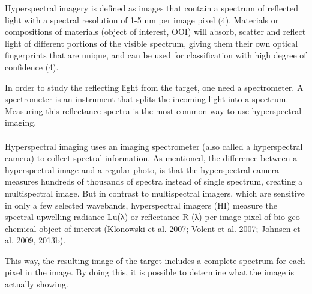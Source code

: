 Hyperspectral imagery is defined as images that contain a spectrum of reflected light with a spectral resolution of 1-5 nm per image pixel (4). Materials or compositions of materials (object of interest, OOI) will absorb, scatter and reflect light of different portions of the visible spectrum, giving them their own optical fingerprints that are unique, and can be used for classification with high degree of confidence (4). 

In order to study the reflecting light from the target, one need a spectrometer. A spectrometer is an instrument that splits the incoming light into a spectrum. Measuring this reflectance spectra is the most common way to use hyperspectral imaging.
\\\\
Hyperspectral imaging uses an imaging spectrometer (also called a hyperspectral camera) to collect spectral information. As mentioned, the difference between a hyperspectral image and a regular photo, is that the hyperspectral camera measures hundreds of thousands of spectra instead of single spectrum, creating a multispectral image. But in contrast to multispectral imagers, which are sensitive in only a few selected wavebands, hyperspectral imagers (HI) measure the spectral upwelling radiance Lu(λ) or reflectance R (λ) per image pixel of bio-geo-chemical object of interest (Klonowski et al. 2007; Volent et al. 2007; Johnsen et al. 2009, 2013b). %

This way, the resulting image of the target includes a complete spectrum for each pixel in the image. By doing this, it is possible to determine what the image is actually showing. 

\\\\




